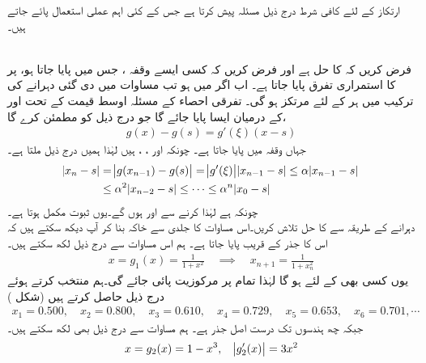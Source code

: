 ارتکاز کے لئے کافی شرط درج ذیل مسئلہ پیش کرتا ہے جس کے کئی اہم عملی استعمال پائے جاتے ہیں۔

\quad {}\\
فرض کریں کہ  کا حل  ہے اور فرض کریں کہ کسی ایسے وقفہ ، جس میں  پایا جاتا ہو، پر  کا استمراری تفرق پایا جاتا ہے۔ اب اگر  میں  ہو تب مساوات  میں دی گئی دہرانے کی ترکیب  میں ہر  کے لئے مرتکز ہو گی۔
\quad
تفرقی احصاء کے مسئلہ اوسط قیمت کے تحت  اور  کے درمیان ایسا  پایا جائے گا جو درج ذیل کو مطمئن کرے گا،
\begin{align*}
g(x)-g(s)=g'(\xi)(x-s) 
\end{align*}
جہاں  وقفہ  میں پایا جاتا ہے۔  چونکہ  اور ، ،  ہیں لہٰذا ہمیں درج ذیل ملتا ہے۔
\begin{align*}
\abs{x_n-s}&=\abs{g(x_{n-1})-g(s)}=\abs{g'(\xi)}\abs{x_{n-1}-s}\le \alpha \abs{x_{n-1}-s}\\
&\le \alpha^2\abs{x_{n-2}-s}\le \cdots \le \alpha^n\abs{x_{0}-s}
\end{align*}
چونکہ  ہے لہٰذا   کرنے سے  اور  ہوں گے۔یوں ثبوت مکمل ہوتا ہے۔
\quad {}\\
دہرانے کے طریقہ سے  کا حل  تلاش کریں۔اس مساوات کا جلدی سے خاکہ  بنا کر آپ دیکھ سکتے ہیں کہ اس کا جذر  کے قریب پایا جاتا ہے۔  ہم اس  مساوات سے درج ذیل لکھ سکتے ہیں۔
\begin{align*}
x=g_1(x)=\frac{1}{1+x^2}\quad \implies \quad x_{n+1}=\frac{1}{1+x_n^2}
\end{align*}
یوں کسی بھی  کے لئے  ہو گا لہٰذا تمام  پر مرکوزیت پائی جائے گی۔ہم  منتخب کرتے ہوئے درج ذیل حاصل کرتے ہیں (شکل )
\begin{align*}
x_1=0.500,\quad x_2=0.800,\quad x_3=0.610,\quad x_4=0.729,\quad x_5=0.653,\quad x_6=0.701,\cdots
\end{align*}
جبکہ چھ ہندسوں تک درست اصل جذر  ہے۔ ہم مساوات سے درج ذیل بھی لکھ سکتے ہیں۔
\begin{align*}
x=g_2(x)=1-x^3,\quad \abs{g_2'(x)}=3x^2 
\end{align*}
